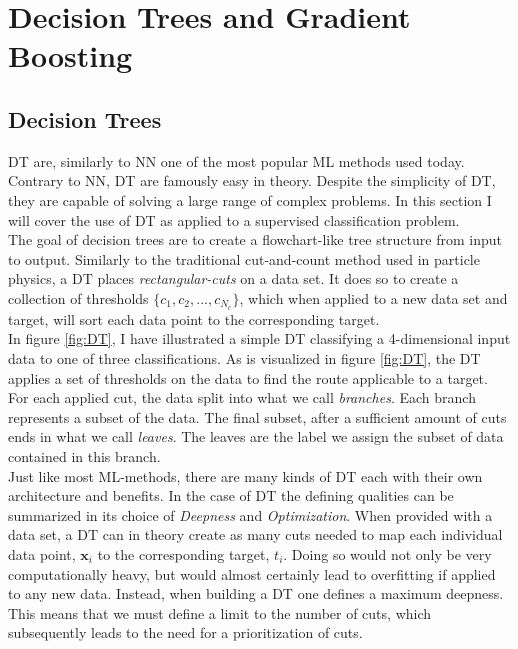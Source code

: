 \section{Decision Trees and Gradient Boosting}
\subsection{Decision Trees}
\ac{DT} are, similarly to \ac{NN} one of the most popular \ac{ML} methods used today.
Contrary to \ac{NN}, \ac{DT} are famously easy in theory. Despite the simplicity of \ac{DT}, 
they are capable of solving a large range of complex problems. In this section I will cover the use 
of \ac{DT} as applied to a supervised classification problem.
\\
The goal of decision trees are to create a flowchart-like tree structure from input to output. 
Similarly to the traditional cut-and-count method used in particle physics, a \ac{DT} 
places \emph{rectangular-cuts} on a data set. It does so to create a collection of thresholds 
$\{c_1, c_2,...,c_{N_c}\}$, which when applied to a new data set and target, 
will sort each data point to the corresponding target. 
\\
In figure \ref{fig:DT}, I have illustrated a simple \ac{DT} classifying a 4-dimensional 
input data to one of three classifications. As is visualized in figure \ref{fig:DT}, the \ac{DT} 
applies a set of thresholds on the data to find the route applicable to a target. For each applied 
cut, the data split into what we call \emph{branches}. Each branch represents a subset of the data.
The final subset, after a sufficient amount of cuts ends in what we call \emph{leaves}. The leaves are 
the label we assign the subset of data contained in this branch.
\\  
Just like most \ac{ML}-methods, there are many kinds of \ac{DT} each with their own 
architecture and benefits. In the case of \ac{DT} the defining qualities can be summarized in
its choice of \emph{Deepness} and \emph{Optimization}. When provided with a data set,
a \ac{DT} can in theory create as many cuts needed to map each individual data point, $\textbf{x}_i$ to the 
corresponding target, $t_i$. Doing so would not only be very computationally heavy, but would almost 
certainly lead to overfitting if applied to any new data. Instead, when building a \ac{DT} one defines 
a maximum deepness. This means that we must define a limit to the number of cuts, which 
subsequently leads to the need for a prioritization of cuts. 
\\
